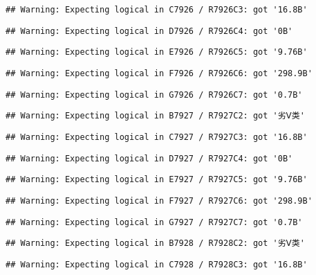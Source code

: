 \documentclass[
]{article}
\begin{document}
\begin{verbatim}
## Warning: Expecting logical in C7926 / R7926C3: got '16.8B'
\end{verbatim}

\begin{verbatim}
## Warning: Expecting logical in D7926 / R7926C4: got '0B'
\end{verbatim}

\begin{verbatim}
## Warning: Expecting logical in E7926 / R7926C5: got '9.76B'
\end{verbatim}

\begin{verbatim}
## Warning: Expecting logical in F7926 / R7926C6: got '298.9B'
\end{verbatim}

\begin{verbatim}
## Warning: Expecting logical in G7926 / R7926C7: got '0.7B'
\end{verbatim}

\begin{verbatim}
## Warning: Expecting logical in B7927 / R7927C2: got '劣Ⅴ类'
\end{verbatim}

\begin{verbatim}
## Warning: Expecting logical in C7927 / R7927C3: got '16.8B'
\end{verbatim}

\begin{verbatim}
## Warning: Expecting logical in D7927 / R7927C4: got '0B'
\end{verbatim}

\begin{verbatim}
## Warning: Expecting logical in E7927 / R7927C5: got '9.76B'
\end{verbatim}

\begin{verbatim}
## Warning: Expecting logical in F7927 / R7927C6: got '298.9B'
\end{verbatim}

\begin{verbatim}
## Warning: Expecting logical in G7927 / R7927C7: got '0.7B'
\end{verbatim}

\begin{verbatim}
## Warning: Expecting logical in B7928 / R7928C2: got '劣Ⅴ类'
\end{verbatim}

\begin{verbatim}
## Warning: Expecting logical in C7928 / R7928C3: got '16.8B'
\end{verbatim}
\end{document}
